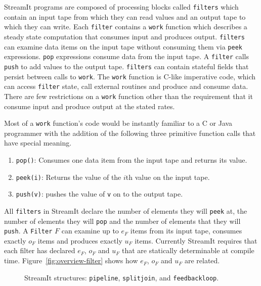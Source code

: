 StreamIt programs are composed of processing blocks called {\tt filters} which
contain an input tape from which they can read values and an output tape to which
they can write. Each {\tt filter} contains a {\tt work} function which describes 
a steady state computation that consumes input and produces output.
{\tt filters } can examine data items  on the input tape without consuming them 
via {\tt peek} expressions. {\tt pop} expressions consume data from the input
tape. A {\tt filter} calls {\tt push} to add values to the output tape.
{\tt filters} can contain stateful fields that persist between calls to {\tt work}. 
The {\tt work} function is C-like imperative code, 
which can access {\tt filter} state, call external routines and produce and consume data. 
There are few restrictions on a {\tt work} function other than the requirement that
it consume input and produce output at the stated rates.

Most of a {\tt work} function's code would be instantly familiar to 
a C or Java programmer with the addition of the following three primitive function 
calls that have special meaning.

\begin{enumerate}
\item {\tt pop()}: Consumes one data item from the input tape and returns its value.
\item {\tt peek(i)}: Returns the value of the $i$th value on the input tape.
\item {\tt push(v)}: pushes the value of {\tt v} on to the output tape.
\end{enumerate}

All {\tt filters} in StreamIt declare the number of elements they
will {\tt peek} at, the number of elements they will {\tt pop} and the number
of elements that they will {\tt push}. A {\tt Filter} $F$ can examine up to $e_F$ 
items from its input tape, consumes exactly $o_F$ items and produces exactly
$u_F$ items. Currently StreamIt requires that each filter has declared $e_F$, $o_F$ 
and $u_F$ that are statically determinable at compile time. 
Figure~\ref{fig:overview-filter} shows how $e_F$, $o_F$ and $u_F$ are related.




\begin{figure}
\center
\epsfxsize=3.0in
\caption{StreamIt structures: {\tt pipeline}, {\tt splitjoin}, and {\tt feedbackloop}.}
\label{fig:structures}
\end{figure}

